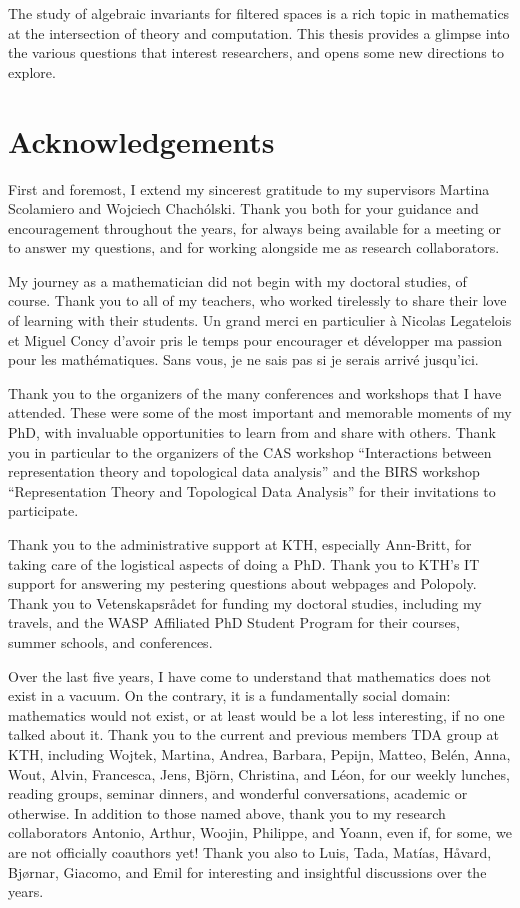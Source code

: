 The study of algebraic invariants for filtered spaces is a rich topic in mathematics at the intersection of theory and computation. This thesis provides a glimpse into the various questions that interest researchers, and opens some new directions to explore.

\chapter{Acknowledgements}

First and foremost, I extend my sincerest gratitude to my supervisors Martina Scolamiero and Wojciech Chachólski. Thank you both for your guidance and encouragement throughout the years, for always being available for a meeting or to answer my questions, and for working alongside me as research collaborators.

My journey as a mathematician did not begin with my doctoral studies, of course. Thank you to all of my teachers, who worked tirelessly to share their love of learning with their students. Un grand merci en particulier à Nicolas Legatelois et Miguel Concy d'avoir pris le temps pour encourager et développer ma passion pour les mathématiques. Sans vous, je ne sais pas si je serais arrivé jusqu'ici.

Thank you to the organizers of the many conferences and workshops that I have attended. These were some of the most important and memorable moments of my PhD, with invaluable opportunities to learn from and share with others. Thank you in particular to the organizers of the CAS workshop ``Interactions between representation theory and topological data analysis'' and the BIRS workshop ``Representation Theory and Topological Data Analysis'' for their invitations to participate.

Thank you to the administrative support at KTH, especially Ann-Britt, for taking care of the logistical aspects of doing a PhD. Thank you to KTH's IT support for answering my pestering questions about webpages and Polopoly. Thank you to Vetenskapsrådet for funding my doctoral studies, including my travels, and the WASP Affiliated PhD Student Program for their courses, summer schools, and conferences.

Over the last five years, I have come to understand that mathematics does not exist in a vacuum. On the contrary, it is a fundamentally social domain: mathematics would not exist, or at least would be a lot less interesting, if no one talked about it. Thank you to the current and previous members TDA group at KTH, including Wojtek, Martina, Andrea, Barbara, Pepijn, Matteo, Belén, Anna, Wout, Alvin, Francesca, Jens, Björn, Christina, and Léon, for our weekly lunches, reading groups, seminar dinners, and wonderful conversations, academic or otherwise. In addition to those named above, thank you to my research collaborators Antonio, Arthur, Woojin, Philippe, and Yoann, even if, for some, we are not officially coauthors yet! Thank you also to Luis, Tada, Matías, Håvard, Bjørnar, Giacomo, and Emil for interesting and insightful discussions over the years.

